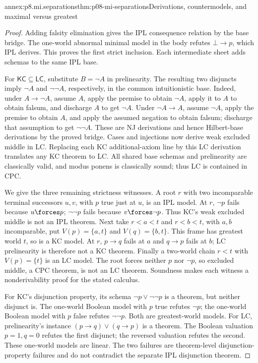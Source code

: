 \begin{annexitem}{annex:p8.mi.separations}{thm:p08-mi-separations}{Derivations, countermodels, and maximal versus greatest}
\begin{proof}
Adding falsity elimination gives the IPL consequence relation by the
base bridge. The one-world abnormal minimal model in the body refutes
\(\bot\to p\), which IPL derives. This proves the first strict
inclusion. Each intermediate sheet adds schemas to the same IPL base.

For \(\mathsf{KC}\subseteq\mathsf{LC}\), substitute
\(B=\neg A\) in prelinearity. The resulting two disjuncts imply
\(\neg A\) and \(\neg\neg A\), respectively, in the common
intuitionistic base. Indeed, under \(A\to\neg A\), assume \(A\),
apply the premise to obtain \(\neg A\), apply it to \(A\) to
obtain falsum, and discharge \(A\) to get \(\neg A\).
Under \(\neg A\to A\), assume \(\neg A\), apply the premise
to obtain \(A\), and apply the assumed negation to obtain falsum;
discharge that assumption to get \(\neg\neg A\). These are NJ
derivations and hence Hilbert-base derivations by the proved bridge.
Cases and injections now derive weak excluded middle in LC. Replacing
each KC additional-axiom line by this LC derivation translates any KC
theorem to LC. All shared base schemas and prelinearity are classically
valid, and modus ponens is classically sound; thus LC is contained in CPC.

We give the three remaining strictness witnesses. A root \(r\) with
two incomparable terminal successors \(u,v\), with \(p\) true just
at \(u\), is an IPL model. At \(r\), \(\neg p\) fails because
\(u\forces p\); \(\neg\neg p\) fails because
\(v\forces\neg p\). Thus KC's weak excluded middle is not an IPL
theorem. Next take \(r<a<t\) and \(r<b<t\), with \(a,b\)
incomparable, put \(V(p)=\{a,t\}\) and \(V(q)=\{b,t\}\).
This frame has greatest world \(t\), so is a KC model. At \(r\),
\(p\to q\) fails at \(a\) and \(q\to p\) fails at \(b\);
LC prelinearity is therefore not a KC theorem. Finally a two-world
chain \(r<t\) with \(V(p)=\{t\}\) is an LC model. The root
forces neither \(p\) nor \(\neg p\), so excluded middle, a CPC
theorem, is not an LC theorem. Soundness makes each witness a
nonderivability proof for the stated calculus.

For KC's disjunction property, its schema \(\neg p\lor\neg\neg p\)
is a theorem, but neither disjunct is. The one-world Boolean model
with \(p\) true refutes \(\neg p\); the one-world Boolean model
with \(p\) false refutes \(\neg\neg p\). Both are greatest-world
models. For LC, prelinearity's instance
\((p\to q)\lor(q\to p)\) is a theorem. The Boolean valuation
\(p=1,q=0\) refutes the first disjunct; the reversed valuation
refutes the second. These one-world models are linear. The two failures
are theorem-level disjunction-property failures and do not contradict
the separate IPL disjunction theorem.


\end{proof}
\end{annexitem}
